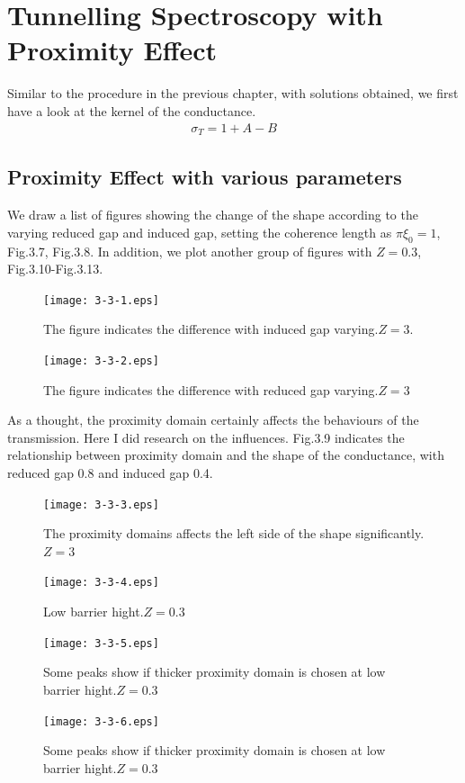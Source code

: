 \section{Tunnelling Spectroscopy with Proximity Effect}
Similar to the procedure in the previous chapter, with solutions obtained, we first have a look at the kernel of the conductance.
\begin{eqnarray}
\sigma_T=1+A-B
\end{eqnarray}
\subsection{Proximity Effect with various parameters}
We draw a list of figures showing the change of the shape according to the varying reduced gap and induced gap, setting the coherence length as $\pi\xi_0=1$, Fig.3.7, Fig.3.8.
In addition, we plot another group of figures with $Z=0.3$, Fig.3.10-Fig.3.13.
\begin{figure}[htbp]
\small
\centering
\texttt{[image: 3-3-1.eps]}
\caption{The figure indicates the difference with induced gap varying.$Z=3$.}
\label{fig:5}
\end{figure}
\begin{figure}[htbp]
\small
\centering
\texttt{[image: 3-3-2.eps]}
\caption{The figure indicates the difference with reduced gap varying.$Z=3$}
\label{fig:6}
\end{figure}

As a thought, the proximity domain certainly affects the behaviours of the transmission. Here I did research on the influences.
Fig.3.9 indicates the relationship between proximity domain and the shape of the conductance, with reduced gap 0.8 and induced gap 0.4.
\begin{figure}[htbp]
\small
\centering
\texttt{[image: 3-3-3.eps]}
\caption{The proximity domains affects the left side of the shape significantly.$Z=3$}
\label{fig:7}
\end{figure}
\begin{figure}[htbp]
\small
\centering
\texttt{[image: 3-3-4.eps]}
\caption{Low barrier hight.$Z=0.3$}
\label{fig:8}
\end{figure} 
\begin{figure}[htbp]
\small
\centering
\texttt{[image: 3-3-5.eps]}
\caption{Some peaks show if thicker proximity domain is chosen at low barrier hight.$Z=0.3$}
\label{fig:9}
\end{figure}
\begin{figure}[htbp]
\small
\centering
\texttt{[image: 3-3-6.eps]}
\caption{Some peaks show if thicker proximity domain is chosen at low barrier hight.$Z=0.3$}
\label{fig:10}
\end{figure}


